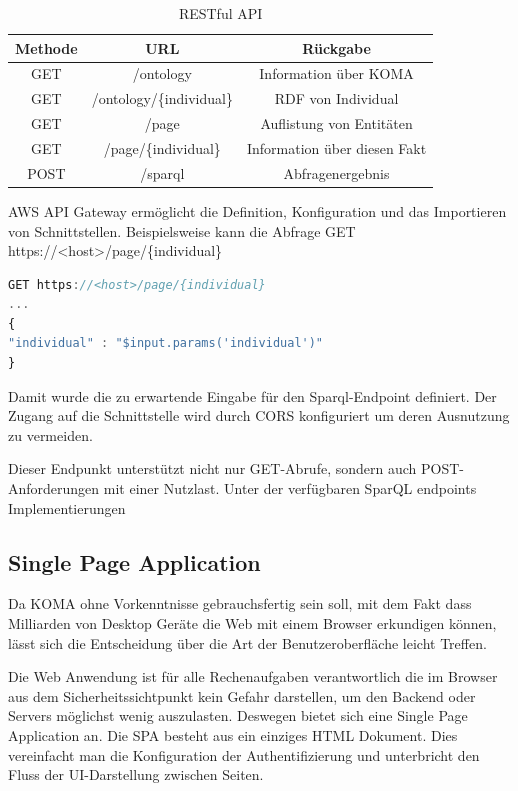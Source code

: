\documentclass[
12pt,
english,
ngerman,
headsepline,
twoside,
openright,
numbers=noenddot,version=first
]{scrreprt}
\providecommand{\tabularnewline}{\\}
\begin{document}
\begin{table}[H]
	\caption{RESTful API}\label{tab:rest}
	\noindent 
	\centering{}
	\begin{tabular}{ccc}
		\hline
		\noalign{\vskip\doublerulesep}
		Methode & URL & Rückgabe\tabularnewline[\doublerulesep]
		\hline
		\noalign{\vskip\doublerulesep}
		GET & /ontology & Information über KOMA
		\tabularnewline[\doublerulesep]\noalign{\vskip\doublerulesep}
		\noalign{\vskip\doublerulesep}
		GET & /ontology/\{individual\} & RDF von Individual
		\tabularnewline[\doublerulesep]\noalign{\vskip\doublerulesep}
		GET & /page & Auflistung von Entitäten 
		\tabularnewline[\doublerulesep]\noalign{\vskip\doublerulesep}
		GET & /page/\{individual\} & Information über diesen Fakt
		\tabularnewline[\doublerulesep]\noalign{\vskip\doublerulesep}
		POST & /sparql & Abfragenergebnis
		
	\end{tabular}
\end{table}

AWS API Gateway ermöglicht die Definition, Konfiguration und das Importieren von Schnittstellen. Beispielsweise kann die Abfrage GET https://<host>/page/\{individual\} 

\begin{lstlisting}[language=Javascript,caption={API Gateway Request Mapping Template},label={lst:map-template}]
GET https://<host>/page/{individual} 
...
{
"individual" : "$input.params('individual')"
}
\end{lstlisting}

Damit wurde die zu erwartende Eingabe für den Sparql-Endpoint definiert. Der Zugang auf die Schnittstelle wird durch CORS konfiguriert um deren Ausnutzung zu vermeiden. 

Dieser Endpunkt unterstützt nicht nur GET-Abrufe, sondern auch POST-Anforderungen mit einer Nutzlast.
Unter der verfügbaren SparQL endpoints Implementierungen



\subsection{Single Page Application}
\label{sec:spa}

Da KOMA ohne Vorkenntnisse gebrauchsfertig sein soll, mit dem Fakt dass Milliarden von Desktop Geräte die Web mit einem Browser erkundigen können, lässt sich die Entscheidung über die Art der Benutzeroberfläche leicht Treffen.

Die Web Anwendung ist für alle Rechenaufgaben verantwortlich die im Browser aus dem Sicherheitssichtpunkt kein Gefahr darstellen, um den Backend oder Servers möglichst wenig auszulasten. Deswegen bietet sich eine Single Page Application an. 
Die SPA besteht aus ein einziges HTML Dokument. Dies vereinfacht man die Konfiguration der Authentifizierung und unterbricht den Fluss der UI-Darstellung zwischen Seiten.
\end{document}
